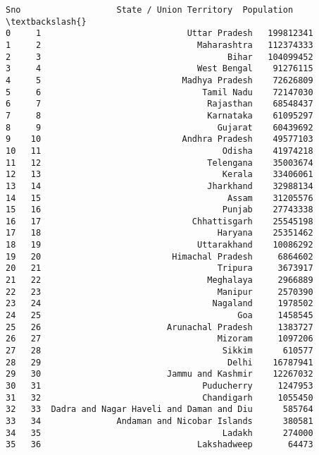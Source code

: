 \documentclass[11pt]{article}
\newcommand{\prompt}[4]{
        \llap{{\color{#2}[#3]: #4}}\vspace{-1.25em}
    }
\begin{document}
            \begin{tcolorbox}[breakable, boxrule=.5pt, size=fbox, pad at break*=1mm, opacityfill=0]
\prompt{Out}{outcolor}{70}{\hspace{3.5pt}}
\begin{Verbatim}[commandchars=\\\{\}]
    Sno                   State / Union Territory  Population  \textbackslash{}
0     1                             Uttar Pradesh   199812341
1     2                               Maharashtra   112374333
2     3                                     Bihar   104099452
3     4                               West Bengal    91276115
4     5                            Madhya Pradesh    72626809
5     6                                Tamil Nadu    72147030
6     7                                 Rajasthan    68548437
7     8                                 Karnataka    61095297
8     9                                   Gujarat    60439692
9    10                            Andhra Pradesh    49577103
10   11                                    Odisha    41974218
11   12                                 Telengana    35003674
12   13                                    Kerala    33406061
13   14                                 Jharkhand    32988134
14   15                                     Assam    31205576
15   16                                    Punjab    27743338
16   17                              Chhattisgarh    25545198
17   18                                   Haryana    25351462
18   19                               Uttarakhand    10086292
19   20                          Himachal Pradesh     6864602
20   21                                   Tripura     3673917
21   22                                 Meghalaya     2966889
22   23                                   Manipur     2570390
23   24                                  Nagaland     1978502
24   25                                       Goa     1458545
25   26                         Arunachal Pradesh     1383727
26   27                                   Mizoram     1097206
27   28                                    Sikkim      610577
28   29                                     Delhi    16787941
29   30                         Jammu and Kashmir    12267032
30   31                                Puducherry     1247953
31   32                                Chandigarh     1055450
32   33  Dadra and Nagar Haveli and Daman and Diu      585764
33   34               Andaman and Nicobar Islands      380581
34   35                                    Ladakh      274000
35   36                               Lakshadweep       64473


\end{Verbatim}
\end{tcolorbox}
\end{document}
